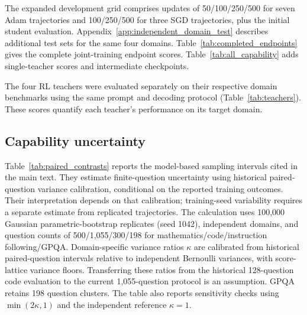 The expanded development grid comprises updates of 50/100/250/500 for seven Adam trajectories and 100/250/500 for three SGD trajectories, plus the initial student evaluation. Appendix~\ref{app:independent_domain_test} describes additional test sets for the same four domains. Table~\ref{tab:completed_endpoints} gives the complete joint-training endpoint scores. Table~\ref{tab:all_capability} adds single-teacher scores and intermediate checkpoints.



\begin{table}[t]
\caption{\textbf{PG/I64 performance depends on the task and checkpoint.} Mean scores (\%): S is mathematics-only training and M is joint training; both use DR. Joint endpoints appear in Table~\ref{tab:completed_endpoints}.}
\label{tab:all_capability}
\centering\small

\end{table}

The four RL teachers were evaluated separately on their respective domain benchmarks using the same prompt and decoding protocol (Table~\ref{tab:teachers}). These scores quantify each teacher's performance on its target domain.

\begin{table}[t]
\caption{\textbf{Reference scores for the four domain-specific teachers} (\%). Science uses GPQA average@4.}
\label{tab:teachers}
\centering\small

\end{table}

\subsection{Capability uncertainty}
\label{app:capability_uncertainty}

Table~\ref{tab:paired_contrasts} reports the model-based sampling intervals cited in the main text. They estimate finite-question uncertainty using historical paired-question variance calibration, conditional on the reported training outcomes. Their interpretation depends on that calibration; training-seed variability requires a separate estimate from replicated trajectories. The calculation uses 100,000 Gaussian parametric-bootstrap replicates (seed 1042), independent domains, and question counts of 500/1,055/300/198 for mathematics/code/instruction following/GPQA. Domain-specific variance ratios $\kappa$ are calibrated from historical paired-question intervals relative to independent Bernoulli variances, with score-lattice variance floors. Transferring these ratios from the historical 128-question code evaluation to the current 1,055-question protocol is an assumption. GPQA retains 198 question clusters. The table also reports sensitivity checks using $\min(2\kappa,1)$ and the independent reference $\kappa=1$.


